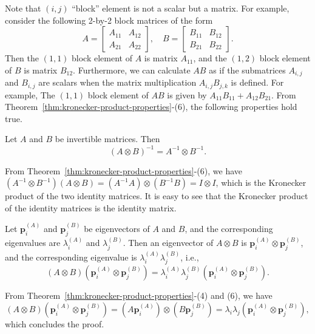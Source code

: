 {Note that $(i,j)$ ``block'' element is not a scalar but a matrix. For example, consider the following 2-by-2 block matrices of the form}
\[A=\begin{bmatrix}A_{11}&A_{12}\\A_{21}&A_{22}\end{bmatrix},\quad B=\begin{bmatrix}B_{11}&B_{12}\\B_{21}&B_{22}\end{bmatrix}.\]
{Then the $(1,1)$ block element of $A$ is matrix $A_{11}$, and the $(1,2)$ block element of $B$ is matrix $B_{12}$. Furthermore, we can calculate $AB$ as if the submatrices $A_{i,j}$ and $B_{i,j}$ are scalars when the matrix multiplication $A_{i,j}B_{j,k}$ is defined. For example, The $(1,1)$ block element of $AB$ is given by $A_{11}B_{11}+A_{12}B_{21}$. From Theorem\ \ref{thm:kronecker-product-properties}-(6), the following properties hold true.}
\begin{Corollary}\label{cor:kronecker-inverse}
{Let $A$ and $B$ be invertible matrices. Then}
\[(A\otimes B)^{-1}=A^{-1}\otimes B^{-1}.\]
\end{Corollary}
\begin{Proof}
{From Theorem\ \ref{thm:kronecker-product-properties}-(6), we have $(A^{-1}\otimes B^{-1})(A\otimes B)=(A^{-1}A)\otimes(B^{-1}B)=I\otimes I$, which is the Kronecker product of the two identity matrices. It is easy to see that the Kronecker product of the identity matrices is the identity matrix.}
\end{Proof}
\begin{Corollary}\label{cor:kronecker-eigenpairs}
{Let $\boldsymbol{p}_i^{(A)}$ and $\boldsymbol{p}_j^{(B)}$ be eigenvectors of $A$ and $B$, and the corresponding eigenvalues are $\lambda_i^{(A)}$ and $\lambda_j^{(B)}$. Then an eigenvector of $A\otimes B$ is $\boldsymbol{p}_i^{(A)}\otimes\boldsymbol{p}_j^{(B)}$, and the corresponding eigenvalue is $\lambda_i^{(A)}\lambda_j^{(B)}$, i.e.,}
\[(A\otimes B)\left(\boldsymbol{p}_i^{(A)}\otimes\boldsymbol{p}_j^{(B)}\right)=\lambda_i^{(A)}\lambda_j^{(B)}\left(\boldsymbol{p}_i^{(A)}\otimes\boldsymbol{p}_j^{(B)}\right).\]
\end{Corollary}
\begin{Proof}
{From Theorem\ \ref{thm:kronecker-product-properties}-(4) and (6), we have}
\[(A\otimes B)\left(\boldsymbol{p}_i^{(A)}\otimes\boldsymbol{p}_j^{(B)}\right)=\left(A\boldsymbol{p}_i^{(A)}\right)\otimes\left(B\boldsymbol{p}_j^{(B)}\right)=\lambda_i\lambda_j\left(\boldsymbol{p}_i^{(A)}\otimes\boldsymbol{p}_j^{(B)}\right),\]
{which concludes the proof.}
\end{Proof}

